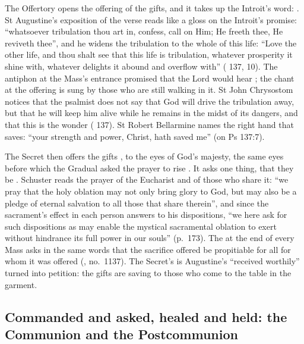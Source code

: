 The Offertory opens the offering of the gifts, and it takes up the Introit's
word: . St
Augustine's exposition of the verse reads like a gloss on the Introit's
promise: ``whatsoever tribulation thou art in, confess, call on Him; He freeth
thee, He reviveth thee'', and he widens the tribulation
to the whole of this life: ``Love the other life, and thou shalt see that this
life is tribulation, whatever prosperity it shine with, whatever delights it
abound and overflow with'' ( 137, 10). The antiphon at the
Mass's entrance promised that the Lord would hear ; the chant at the offering is sung by those who are still
walking in it. St John Chrysostom notices that the psalmist does not say that
God will drive the tribulation away, but that he will keep him alive while he
remains in the midst of its dangers, and that this is the wonder ( 137). St Robert Bellarmine names the right hand that saves:
``your strength and power, Christ, hath saved me'' (on Ps 137:7).

The Secret then offers the gifts , to the eyes of
God's majesty, the same eyes before which the Gradual asked the prayer to rise
. It asks one thing, that they be . Schuster reads the prayer of the Eucharist and of those who share it:
``we pray that the holy oblation may not only bring glory to God, but may also
be a pledge of eternal salvation to all those that share therein'', and since
the sacrament's effect in each person answers to his dispositions, ``we here
ask for such dispositions as may enable the mystical sacramental oblation to
exert without hindrance its full power in our souls'' (p.~173). The
 at the end of every Mass asks in the same words that the
sacrifice offered  be propitiable for all for
whom it was offered (, no.~1137). The Secret's
 is Augustine's ``received worthily'' turned into
petition: the gifts are saving to those who come to the table in the garment.

\subsection{Commanded and asked, healed and held: the Communion and the Postcommunion}

